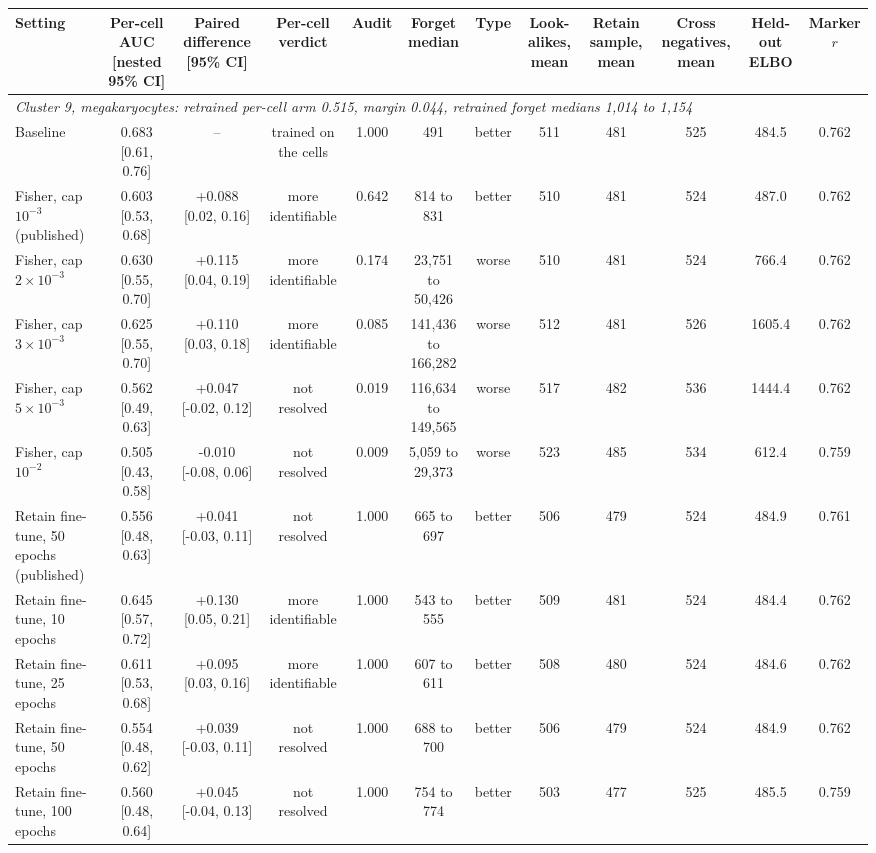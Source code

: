 \begin{tabular}{lccccccccccc}
\toprule
Setting & Per-cell AUC [nested 95\% CI] & Paired difference [95\% CI] & Per-cell verdict & Audit & Forget median & Type & Look-alikes, mean & Retain sample, mean & Cross negatives, mean & Held-out ELBO & Marker $r$ \\
\midrule
\multicolumn{12}{l}{\emph{Cluster 9, megakaryocytes: retrained per-cell arm 0.515, margin 0.044, retrained forget medians 1,014 to 1,154}} \\
Baseline & 0.683 [0.61, 0.76] & -- & trained on the cells & 1.000 & 491 & better & 511 & 481 & 525 & 484.5 & 0.762 \\
Fisher, cap $10^{-3}$ (published) & 0.603 [0.53, 0.68] & +0.088 [0.02, 0.16] & more identifiable & 0.642 & 814 to 831 & better & 510 & 481 & 524 & 487.0 & 0.762 \\
Fisher, cap $2\times 10^{-3}$ & 0.630 [0.55, 0.70] & +0.115 [0.04, 0.19] & more identifiable & 0.174 & 23,751 to 50,426 & worse & 510 & 481 & 524 & 766.4 & 0.762 \\
Fisher, cap $3\times 10^{-3}$ & 0.625 [0.55, 0.70] & +0.110 [0.03, 0.18] & more identifiable & 0.085 & 141,436 to 166,282 & worse & 512 & 481 & 526 & 1605.4 & 0.762 \\
Fisher, cap $5\times 10^{-3}$ & 0.562 [0.49, 0.63] & +0.047 [-0.02, 0.12] & not resolved & 0.019 & 116,634 to 149,565 & worse & 517 & 482 & 536 & 1444.4 & 0.762 \\
Fisher, cap $10^{-2}$ & 0.505 [0.43, 0.58] & -0.010 [-0.08, 0.06] & not resolved & 0.009 & 5,059 to 29,373 & worse & 523 & 485 & 534 & 612.4 & 0.759 \\
Retain fine-tune, 50 epochs (published) & 0.556 [0.48, 0.63] & +0.041 [-0.03, 0.11] & not resolved & 1.000 & 665 to 697 & better & 506 & 479 & 524 & 484.9 & 0.761 \\
Retain fine-tune, 10 epochs & 0.645 [0.57, 0.72] & +0.130 [0.05, 0.21] & more identifiable & 1.000 & 543 to 555 & better & 509 & 481 & 524 & 484.4 & 0.762 \\
Retain fine-tune, 25 epochs & 0.611 [0.53, 0.68] & +0.095 [0.03, 0.16] & more identifiable & 1.000 & 607 to 611 & better & 508 & 480 & 524 & 484.6 & 0.762 \\
Retain fine-tune, 50 epochs & 0.554 [0.48, 0.62] & +0.039 [-0.03, 0.11] & not resolved & 1.000 & 688 to 700 & better & 506 & 479 & 524 & 484.9 & 0.762 \\
Retain fine-tune, 100 epochs & 0.560 [0.48, 0.64] & +0.045 [-0.04, 0.13] & not resolved & 1.000 & 754 to 774 & better & 503 & 477 & 525 & 485.5 & 0.759 \\

\end{tabular}
